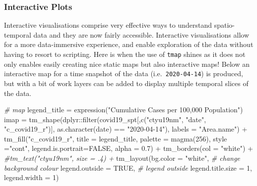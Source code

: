\documentclass[
]{book}
\newenvironment{Shaded}{\begin{snugshade}}{\end{snugshade}}
\newcommand{\AttributeTok}[1]{\textcolor[rgb]{0.77,0.63,0.00}{#1}}
\newcommand{\CommentTok}[1]{\textcolor[rgb]{0.56,0.35,0.01}{\textit{#1}}}
\newcommand{\ConstantTok}[1]{\textcolor[rgb]{0.00,0.00,0.00}{#1}}
\newcommand{\DecValTok}[1]{\textcolor[rgb]{0.00,0.00,0.81}{#1}}
\newcommand{\FloatTok}[1]{\textcolor[rgb]{0.00,0.00,0.81}{#1}}
\newcommand{\FunctionTok}[1]{\textcolor[rgb]{0.00,0.00,0.00}{#1}}
\newcommand{\NormalTok}[1]{#1}
\newcommand{\OtherTok}[1]{\textcolor[rgb]{0.56,0.35,0.01}{#1}}
\newcommand{\SpecialCharTok}[1]{\textcolor[rgb]{0.00,0.00,0.00}{#1}}
\newcommand{\StringTok}[1]{\textcolor[rgb]{0.31,0.60,0.02}{#1}}
\begin{document}
\hypertarget{interactive-plots}{%
\subsubsection{Interactive Plots}\label{interactive-plots}}

Interactive visualisations comprise very effective ways to understand spatio-temporal data and they are now fairly accessible. Interactive visualisations allow for a more data-immersive experience, and enable exploration of the data without having to resort to scripting. Here is when the use of \texttt{tmap} shines as it does not only enables easily creating nice static maps but also interactive maps! Below an interactive map for a time snapshot of the data (i.e.~\texttt{2020-04-14}) is produced, but with a bit of work layers can be added to display multiple temporal slices of the data.

\begin{Shaded}
\begin{Highlighting}[]
\CommentTok{\# map}
\NormalTok{legend\_title }\OtherTok{=} \FunctionTok{expression}\NormalTok{(}\StringTok{"Cumulative Cases per 100,000 Population"}\NormalTok{)}
\NormalTok{imap }\OtherTok{=} \FunctionTok{tm\_shape}\NormalTok{(dplyr}\SpecialCharTok{::}\FunctionTok{filter}\NormalTok{(covid19\_spt[,}\FunctionTok{c}\NormalTok{(}\StringTok{"ctyu19nm"}\NormalTok{, }\StringTok{"date"}\NormalTok{, }\StringTok{"c\_covid19\_r"}\NormalTok{)], }\FunctionTok{as.character}\NormalTok{(date) }\SpecialCharTok{==} \StringTok{"2020{-}04{-}14"}\NormalTok{), }\AttributeTok{labels =} \StringTok{"Area.name"}\NormalTok{) }\SpecialCharTok{+}
  \FunctionTok{tm\_fill}\NormalTok{(}\StringTok{"c\_covid19\_r"}\NormalTok{, }\AttributeTok{title =}\NormalTok{ legend\_title, }\AttributeTok{palette =} \FunctionTok{magma}\NormalTok{(}\DecValTok{256}\NormalTok{), }\AttributeTok{style =}\StringTok{"cont"}\NormalTok{, }\AttributeTok{legend.is.portrait=}\ConstantTok{FALSE}\NormalTok{, }\AttributeTok{alpha =} \FloatTok{0.7}\NormalTok{) }\SpecialCharTok{+}
  \FunctionTok{tm\_borders}\NormalTok{(}\AttributeTok{col =} \StringTok{"white"}\NormalTok{) }\SpecialCharTok{+}
  \CommentTok{\#tm\_text("ctyu19nm", size = .4) +}
  \FunctionTok{tm\_layout}\NormalTok{(}\AttributeTok{bg.color =} \StringTok{"white"}\NormalTok{, }\CommentTok{\# change background colour}
            \AttributeTok{legend.outside =} \ConstantTok{TRUE}\NormalTok{, }\CommentTok{\# legend outside}
            \AttributeTok{legend.title.size =} \DecValTok{1}\NormalTok{,}
            \AttributeTok{legend.width =} \DecValTok{1}\NormalTok{) }
\end{Highlighting}
\end{Shaded}
\end{document}
